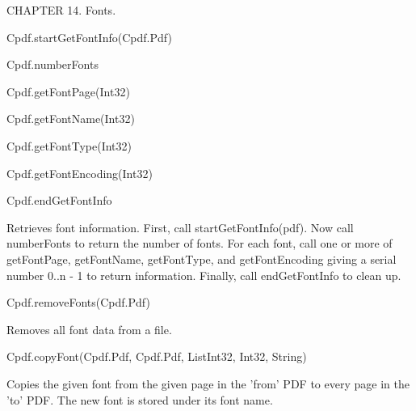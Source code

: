 CHAPTER 14. Fonts.

Cpdf.startGetFontInfo(Cpdf.Pdf)

Cpdf.numberFonts

Cpdf.getFontPage(Int32)

Cpdf.getFontName(Int32)

Cpdf.getFontType(Int32)

Cpdf.getFontEncoding(Int32)

Cpdf.endGetFontInfo

Retrieves font information. First, call startGetFontInfo(pdf). Now call
numberFonts to return the number of fonts. For each font, call one or more of
getFontPage, getFontName, getFontType, and getFontEncoding giving a serial
number 0..n - 1 to return information. Finally, call endGetFontInfo to clean
up.

Cpdf.removeFonts(Cpdf.Pdf)

Removes all font data from a file.

Cpdf.copyFont(Cpdf.Pdf, Cpdf.Pdf, List{Int32}, Int32, String)

Copies the given font from the given page in the 'from' PDF to every page in
the 'to' PDF. The new font is stored under its font name.
